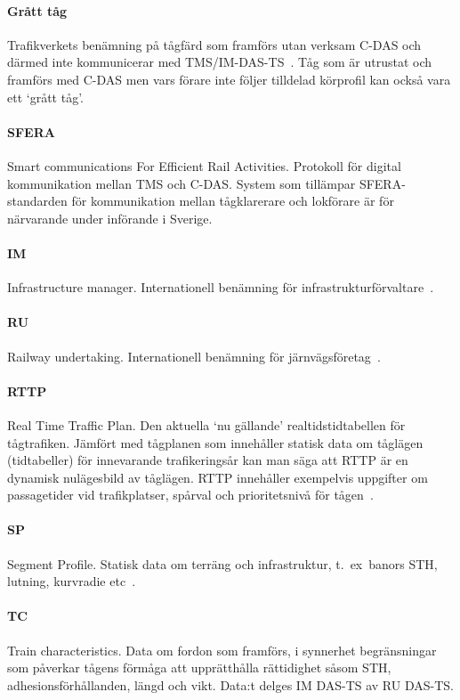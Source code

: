 \paragraph{Grått tåg}
Trafikverkets benämning på tågfärd som framförs utan verksam C-DAS och därmed inte kommunicerar med TMS/IM-DAS-TS~\cite{Joborn2023, Lindmark2022}.
Tåg som är utrustat och framförs med C-DAS men vars förare inte följer tilldelad körprofil kan också vara ett \lq{}grått tåg\rq{}.
\paragraph{SFERA}
Smart communications For Efficient Rail Activities.
Protokoll för digital kommunikation mellan TMS och C-DAS\@.
System som tillämpar SFERA-standarden för kommunikation mellan tågklarerare och lokförare är för närvarande under införande i Sverige\cite{Joborn2023}.
\paragraph{IM}
Infrastructure manager.
Internationell benämning för infrastrukturförvaltare~\cite{Olsson2023}.
\paragraph{RU}
Railway undertaking.
Internationell benämning för järnvägsföretag~\cite{Olsson2023}.
\paragraph{RTTP}
Real Time Traffic Plan.
Den aktuella \lq{}nu gällande\rq{} realtidstidtabellen för tågtrafiken.
Jämfört med tågplanen som innehåller statisk data om tåglägen (tidtabeller) för innevarande trafikeringsår kan man säga att RTTP är en dynamisk nulägesbild av tåglägen.
RTTP innehåller exempelvis uppgifter om passagetider vid trafikplatser, spårval och prioritetsnivå för tågen~\cite{Joborn2023, Olsson2023}.
\paragraph{SP}
Segment Profile.
Statisk data om terräng och infrastruktur, t.~ex~banors STH, lutning, kurvradie etc~\cite{Olsson2023}.
\paragraph{TC}
Train characteristics.
Data om fordon som framförs, i synnerhet begränsningar som påverkar tågens förmåga att upprätthålla rättidighet såsom STH, adhesionsförhållanden, längd och vikt.
Data:t delges IM DAS-TS av RU DAS-TS\@.
